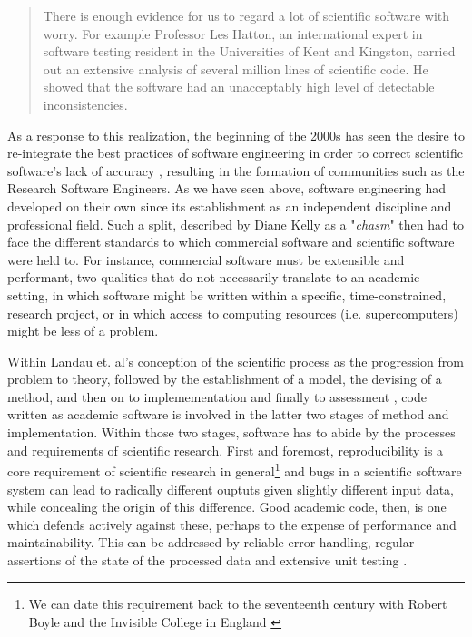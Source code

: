 \begin{quote}
  There is enough evidence for us to regard a lot of scientific software with worry. For example Professor Les Hatton, an international expert in software testing resident in the Universities of Kent and Kingston, carried out an extensive analysis of several million lines of scientific code. He showed that the software had an unacceptably high level of detectable inconsistencies. \citep{committee_disclosure_2010}
\end{quote}

As a response to this realization, the beginning of the 2000s has seen the desire to re-integrate the best practices of software engineering in order to correct scientific software's lack of accuracy \citep{hatton_how_1994}, resulting in the formation of communities such as the Research Software Engineers\citep{woolston_why_2022}. As we have seen above, software engineering had developed on their own since its establishment as an independent discipline and professional field. Such a split, described by Diane Kelly as a "\emph{chasm}" \citep{kelly_software_2007} then had to face the different standards to which commercial software and scientific software were held to. For instance, commercial software must be extensible and performant, two qualities that do not necessarily translate to an academic setting, in which software might be written within a specific, time-constrained, research project, or in which access to computing resources (i.e. supercomputers) might be less of a problem.

Within Landau et. al's conception of the scientific process as the progression from problem to theory, followed by the establishment of a model, the devising of a method, and then on to implemementation and finally to assessment \citep{landau_survey_2011}, code written as academic software is involved in the latter two stages of  method and implementation. Within those two stages, software has to abide by the processes and requirements of scientific research. First and foremost, reproducibility is a core requirement of scientific research in general\footnote{We can date this requirement back to the seventeenth century with Robert Boyle and the Invisible College in England \citep{leveque_reproducible_2012}} and bugs in a scientific software system can lead to radically different ouptuts given slightly different input data, while concealing the origin of this difference. Good academic code, then, is one which defends actively against these, perhaps to the expense of performance and maintainability. This can be addressed by reliable error-handling, regular assertions of the state of the processed data and extensive unit testing \citep{wilson_best_2014}.

